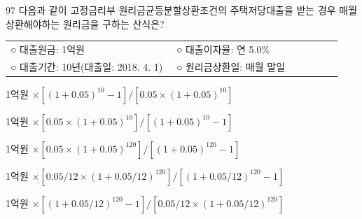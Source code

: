\begin{question}{97}
다음과 같이 고정금리부 원리금균등분할상환조건의 주택저당대출을 받는 경우 매월 상환해야하는 원리금을 구하는 산식은?
\begin{framedtext}
\begin{tabular}{@{}p{0.47\linewidth}@{}p{0.47\linewidth}@{}}
○ 대출원금: 1억원 & ○ 대출이자율: 연 5.0\% \\
○ 대출기간: 10년(대출일: 2018. 4. 1) & ○ 원리금상환일: 매월 말일 \\
\end{tabular}
\end{framedtext}
\begin{choices}
  \item 1억원 $\times [(1+0.05)^{10}-1] / [0.05\times(1+0.05)^{10}]$
  \item 1억원 $\times [0.05\times(1+0.05)^{10}] / [(1+0.05)^{10}-1]$
  \item 1억원 $\times [0.05\times(1+0.05)^{120}] / [(1+0.05)^{120}-1]$
  \item 1억원 $\times [0.05/12\times(1+0.05/12)^{120}] / [(1+0.05/12)^{120}-1]$
  \item 1억원 $\times [(1+0.05/12)^{120}-1] / [0.05/12\times(1+0.05/12)^{120}]$
\end{choices}
\end{question}
